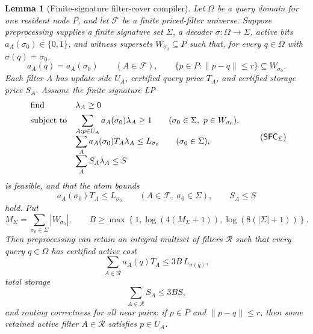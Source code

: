 \documentclass[10pt]{article}
\newtheorem{lemma}[theorem]{Lemma}
\theoremstyle{definition}
\begin{document}
\begin{lemma}[Finite-signature filter-cover compiler]
   \label{lem:finite-signature-filter-cover}
   Let $\Omega$ be a query domain for one resident node \(P\), and let
   $\mathcal F$ be a finite priced-filter universe.  Suppose preprocessing
   supplies a finite signature set \(\Sigma\), a decoder
   \(\sigma:\Omega\to\Sigma\), active bits \(a_A(\sigma_0)\in\{0,1\}\), and
   witness supersets \(W_{\sigma_0}\subseteq P\) such that, for every
   \(q\in\Omega\) with \(\sigma(q)=\sigma_0\),
   \[
      a_A(q)=a_A(\sigma_0)\qquad(A\in\mathcal F),
      \qquad
      \{p\in P:\|p-q\|\le r\}\subseteq W_{\sigma_0}.
      \tag{FS1}
   \]
   Each filter \(A\) has update side \(U_A\), certified query price \(T_A\),
   and certified storage price \(S_A\).  Assume the finite signature LP
   \[
   \begin{array}{ll}
   \text{\rm find} & \lambda_A\ge0\\[0.4em]
   \text{\rm subject to}
      & \displaystyle
        \sum_{A:p\in U_A}a_A(\sigma_0)\lambda_A\ge1
        \qquad(\sigma_0\in\Sigma,\ p\in W_{\sigma_0}),\\[0.8em]
      & \displaystyle
        \sum_Aa_A(\sigma_0)T_A\lambda_A\le L_{\sigma_0}
        \qquad(\sigma_0\in\Sigma),\\[0.8em]
      & \displaystyle
        \sum_AS_A\lambda_A\le S
   \end{array}
   \tag{$\mathsf{SFC}_\Sigma$}
   \]
   is feasible, and that the atom bounds
   \[
      a_A(\sigma_0)T_A\le L_{\sigma_0}
      \qquad(A\in\mathcal F,\ \sigma_0\in\Sigma),
      \qquad
      S_A\le S
      \tag{FS2}
   \]
   hold.  Put
   \[
      M_\Sigma=\sum_{\sigma_0\in\Sigma}|W_{\sigma_0}|,
      \qquad
      B\ge
      \max\left\{
         1,\log(4(M_\Sigma+1)),\log(8(|\Sigma|+1))
      \right\}.
   \]
   Then preprocessing can retain an integral multiset of filters \(\mathcal R\)
   such that every query \(q\in\Omega\) has certified active cost
   \[
      \sum_{A\in\mathcal R}a_A(q)T_A
      \le
      3B\,L_{\sigma(q)},
   \]
   total storage
   \[
      \sum_{A\in\mathcal R}S_A\le3BS,
   \]
   and routing correctness for all near pairs: if \(p\in P\) and
   \(\|p-q\|\le r\), then some retained active filter \(A\in\mathcal R\)
   satisfies \(p\in U_A\).
\end{lemma}
\end{document}

